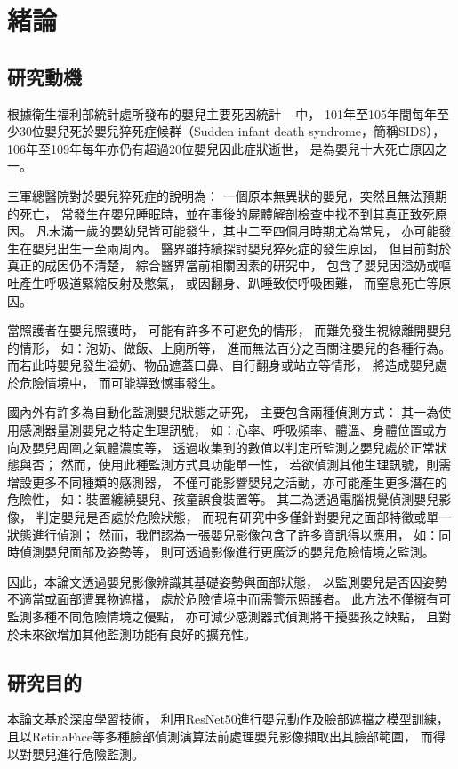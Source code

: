 \documentclass[class=NCU_thesis, crop=false]{standalone}
\begin{document}
\chapter{緒論}
\section{研究動機}
根據衛生福利部統計處所發布的嬰兒主要死因統計
~\cite{__2021}
中，
101年至105年間每年至少30位嬰兒死於嬰兒猝死症候群（Sudden infant death syndrome，簡稱SIDS），
106年至109年每年亦仍有超過20位嬰兒因此症狀逝世，
是為嬰兒十大死亡原因之一。

三軍總醫院對於嬰兒猝死症的說明為：
一個原本無異狀的嬰兒，突然且無法預期的死亡，
常發生在嬰兒睡眠時，並在事後的屍體解剖檢查中找不到其真正致死原因。
凡未滿一歲的嬰幼兒皆可能發生，其中二至四個月時期尤為常見，
亦可能發生在嬰兒出生一至兩周內。
醫界雖持續探討嬰兒猝死症的發生原因，
但目前對於真正的成因仍不清楚，
綜合醫界當前相關因素的研究中，
包含了嬰兒因溢奶或嘔吐產生呼吸道緊縮反射及憋氣，
或因翻身、趴睡致使呼吸困難，
而窒息死亡等原因。

當照護者在嬰兒照護時，
可能有許多不可避免的情形，
而難免發生視線離開嬰兒的情形，
如：泡奶、做飯、上廁所等，
進而無法百分之百關注嬰兒的各種行為。
而若此時嬰兒發生溢奶、物品遮蓋口鼻、自行翻身或站立等情形，
將造成嬰兒處於危險情境中，
而可能導致憾事發生。

國內外有許多為自動化監測嬰兒狀態之研究，
主要包含兩種偵測方式：
其一為使用感測器量測嬰兒之特定生理訊號，
如：心率、呼吸頻率、體溫、身體位置或方向及嬰兒周圍之氣體濃度等，
透過收集到的數值以判定所監測之嬰兒處於正常狀態與否；
然而，使用此種監測方式具功能單一性，
若欲偵測其他生理訊號，則需增設更多不同種類的感測器，
不僅可能影響嬰兒之活動，亦可能產生更多潛在的危險性，
如：裝置纏繞嬰兒、孩童誤食裝置等。
其二為透過電腦視覺偵測嬰兒影像，
判定嬰兒是否處於危險狀態，
而現有研究中多僅針對嬰兒之面部特徵或單一狀態進行偵測；
然而，我們認為一張嬰兒影像包含了許多資訊得以應用，
如：同時偵測嬰兒面部及姿勢等，
則可透過影像進行更廣泛的嬰兒危險情境之監測。

因此，本論文透過嬰兒影像辨識其基礎姿勢與面部狀態，
以監測嬰兒是否因姿勢不適當或面部遭異物遮擋，
處於危險情境中而需警示照護者。
此方法不僅擁有可監測多種不同危險情境之優點，
亦可減少感測器式偵測將干擾嬰孩之缺點，
且對於未來欲增加其他監測功能有良好的擴充性。

\section{研究目的}
本論文基於深度學習技術，
利用ResNet50進行嬰兒動作及臉部遮擋之模型訓練，
且以RetinaFace等多種臉部偵測演算法前處理嬰兒影像擷取出其臉部範圍，
而得以對嬰兒進行危險監測。
\end{document}
